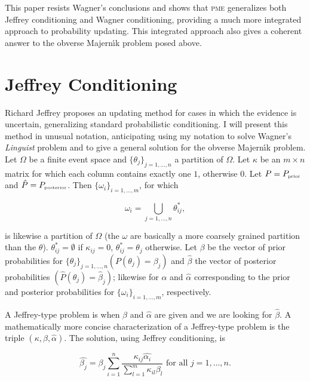 \documentclass[entropy,article,submit,oneauthor,pdftex,12pt,a4paper]{mdpi}
\begin{document}
This paper resists Wagner's conclusions and shows that \textsc{pme}
generalizes both Jeffrey conditioning and Wagner conditioning,
providing a much more integrated approach to probability updating.
This integrated approach also gives a coherent answer to the obverse
Majern{\'\i}k problem posed above.

\section{Jeffrey Conditioning}
\label{jc}

Richard Jeffrey proposes an updating method for cases in which the
evidence is uncertain, generalizing standard probabilistic
conditioning. I will present this method in unusual notation,
anticipating using my notation to solve Wagner's \emph{Linguist}
problem and to give a general solution for the obverse Majern{\'\i}k
problem. Let $\Omega$ be a finite event space and
$\{\theta_{j}\}_{j=1,\ldots,n}$ a partition of $\Omega$. Let $\kappa$
be an $m\times{}n$ matrix for which each column contains exactly one
$1$, otherwise $0$. Let $P=P_{\mbox{\tiny{prior}}}$ and
$\hat{P}=P_{\mbox{\tiny{posterior}}}$. Then
$\{\omega_{i}\}_{i=1,\ldots,m}$, for which

\begin{equation}
  \label{eq:m1}
  \omega_{i}=\bigcup_{j=1,\dots,n}\theta^{*}_{ij},
\end{equation}

{\noindent}is likewise a partition of $\Omega$ (the $\omega$ are
basically a more coarsely grained partition than the $\theta$).
$\theta^{*}_{ij}=\emptyset$ if $\kappa_{ij}=0$,
$\theta^{*}_{ij}=\theta_{j}$ otherwise. Let $\beta$ be the vector of
prior probabilities for $\{\theta_{j}\}_{j=1,\ldots,n}
(P(\theta_{j})=\beta_{j})$ and $\hat{\beta}$ the vector of posterior
probabilities $(\hat{P}(\theta_{j})=\hat{\beta}_{j})$; likewise for
$\alpha$ and $\hat{\alpha}$ corresponding to the prior and posterior
probabilities for $\{\omega_{i}\}_{i=1,\ldots,m}$, respectively.

A Jeffrey-type problem is when $\beta$ and $\hat{\alpha}$ are given
and we are looking for $\hat{\beta}$. A mathematically more concise
characterization of a Jeffrey-type problem is the triple
$(\kappa,\beta,\hat{\alpha})$. The solution, using Jeffrey
conditioning, is

\begin{equation}
  \label{eq:m2}
  \hat{\beta_{j}}=\beta_{j}\sum_{i=1}^{n}\frac{\kappa_{ij}\hat{\alpha_{i}}}{\sum_{l=1}^{m}\kappa_{il}\beta_{l}}\mbox{ for all }j=1,\ldots,n.
\end{equation}
\end{document}
